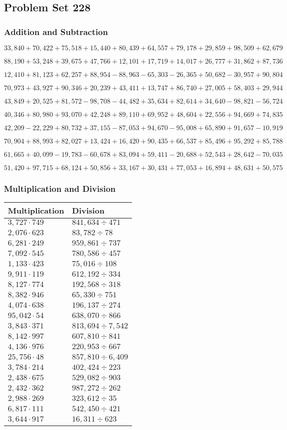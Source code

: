 \hypertarget{problem-set-228}{%
\subsection{Problem Set 228}\label{problem-set-228}}

\hypertarget{addition-and-subtraction}{%
\subsubsection{Addition and
Subtraction}\label{addition-and-subtraction}}

\(33,840+70,422+75,518+15,440+80,439+64,557+79,178+29,859+98,509+62,679\)

\(88,190+53,248+39,675+47,766+12,101+17,719+14,017+26,777+31,862+87,736\)

\(12,410+81,123+62,257+88,954-88,963-65,303-26,365+50,682-30,957+90,804\)

\(70,973+43,927+90,346+20,239+43,411+13,747+86,740+27,005+58,403+29,944\)

\(43,849+20,525+81,572-98,708-44,482+35,634+82,614+34,640-98,821-56,724\)

\(40,346+80,980+93,070+42,248+89,110+69,952+48,604+22,556+94,669+74,835\)

\(42,209-22,229+80,732+37,155-87,053+94,670-95,008+65,890+91,657-10,919\)

\(70,904+88,993+82,027+13,424+16,420+90,435+66,537+85,496+95,292+85,788\)

\(61,665+40,099-19,783-60,678+83,094+59,411-20,688+52,543+28,642-70,035\)

\(51,420+97,715+68,124+50,856+33,167+30,431+77,053+16,894+48,631+50,575\)

\hypertarget{multiplication-and-division}{%
\subsubsection{Multiplication and
Division}\label{multiplication-and-division}}

\begin{longtable}[]{@{}ll@{}}
\toprule
Multiplication & Division\tabularnewline
\midrule
\endhead
\(3,727\cdot749\) & \(841,634÷471\)\tabularnewline
\(2,076\cdot623\) & \(83,782÷78\)\tabularnewline
\(6,281\cdot249\) & \(959,861÷737\)\tabularnewline
\(7,092\cdot545\) & \(780,586÷457\)\tabularnewline
\(1,133\cdot423\) & \(75,016÷108\)\tabularnewline
\(9,911\cdot119\) & \(612,192÷334\)\tabularnewline
\(8,127\cdot774\) & \(192,568÷318\)\tabularnewline
\(8,382\cdot946\) & \(65,330÷751\)\tabularnewline
\(4,074\cdot638\) & \(196,137÷274\)\tabularnewline
\(95,042\cdot54\) & \(638,070÷866\)\tabularnewline
\(3,843\cdot371\) & \(813,694÷7,542\)\tabularnewline
\(8,142\cdot997\) & \(607,810÷841\)\tabularnewline
\(4,136\cdot976\) & \(220,953÷667\)\tabularnewline
\(25,756\cdot48\) & \(857,810÷6,409\)\tabularnewline
\(3,784\cdot214\) & \(402,424÷223\)\tabularnewline
\(2,438\cdot675\) & \(529,082÷903\)\tabularnewline
\(2,432\cdot362\) & \(987,272÷262\)\tabularnewline
\(2,988\cdot269\) & \(323,612÷35\)\tabularnewline
\(6,817\cdot111\) & \(542,450÷421\)\tabularnewline
\(3,644\cdot917\) & \(16,311÷623\)\tabularnewline
\bottomrule
\end{longtable}
